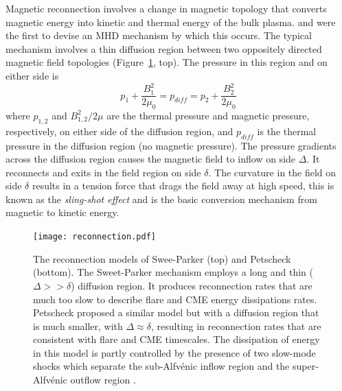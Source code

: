 Magnetic reconnection involves a change in magnetic topology that converts magnetic energy into kinetic and thermal energy of the bulk plasma. \citet{sweet1958} and \citet{parker1963} were the first to devise an MHD mechanism by which this occurs. The typical mechanism involves a thin diffusion region between two oppositely directed magnetic field topologies (Figure~\ref{fig:recconection}, top). The pressure in this region and on either side is
\begin{equation}
p_1  + \frac{B^2_1}{2\mu_0} = p_{diff}  = p_2  + \frac{B^2_2}{2\mu_0}
\end{equation}
where $p_{1,2}$ and $B^2_{1,2}/2\mu$ are the thermal pressure and magnetic pressure, respectively, on either side of the diffusion region, and $p_{diff}$ is the thermal pressure in the diffusion region (no magnetic pressure). The pressure gradients across the diffusion region causes the magnetic field to inflow on side $\Delta$. It reconnects and exits in the field region on side $\delta$. The curvature in the field on side $\delta$ results in a tension force that drags the field away at high speed, this is known as the \emph{sling-shot effect} and is the basic conversion mechanism from magnetic to kinetic energy.
\begin{figure}[!t]
\begin{center}
\texttt{[image: reconnection.pdf]}
\caption[Sweet-Parker and Petscheck reconnection models]{The reconnection models of Swee-Parker (top) and Petscheck (bottom). The Sweet-Parker mechanism employs a long and thin ($\Delta>>\delta$) diffusion region. It produces reconnection rates that are much too slow to describe flare and CME energy dissipations rates. Petscheck proposed a similar model but with a diffusion region that is much smaller, with $\Delta\approx\delta$, resulting in reconnection rates that are consistent with flare and CME timescales. The dissipation of energy in this model is partly controlled by the presence of two slow-mode shocks which separate the sub-Alfv\'{e}nic inflow region and the super-Alfv\'{e}nic outflow region \citep{asch2004}.}
\label{fig:recconection}
\end{center}
\end{figure}

